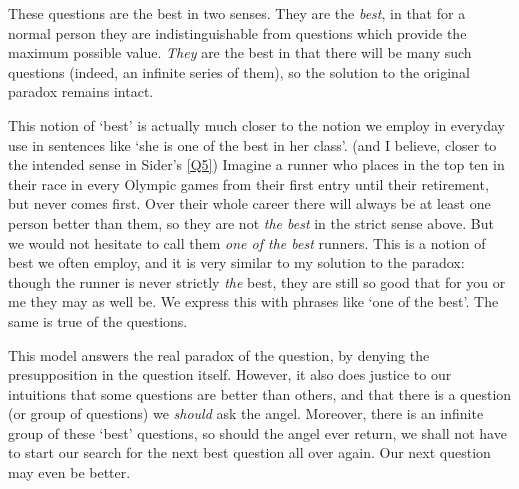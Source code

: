 These questions are the best in two senses.
They are the \emph{best}, in that for a normal person they are indistinguishable from questions which provide the maximum possible value.
\emph{They} are the best in that there will be many such questions (indeed, an infinite series of them), so the solution to the original paradox remains intact.

This notion of `best' is actually much closer to the notion we employ in everyday use in sentences like `she is one of the best in her class'. (and I believe, closer to the intended sense in Sider's \ref{Q5})
Imagine a runner who places in the top ten in their race in every Olympic games from their first entry until their retirement, but never comes first.
Over their whole career there will always be at least one person better than them, so they are not \emph{the best} in the strict sense above.
But we would not hesitate to call them \emph{one of the best} runners.
This is a notion of best we often employ, and it is very similar to my solution to the paradox: though the runner is never strictly \emph{the} best, they are still so good that for you or me they may as well be.
We express this with phrases like `one of the best'.
The same is true of the questions.

This model answers the real paradox of the question, by denying the presupposition in the question itself.
However, it also does justice to our intuitions that some questions are better than others, and that there is a question (or group of questions) we \emph{should} ask the angel.
Moreover, there is an infinite group of these `best' questions, so should the angel ever return, we shall not have to start our search for the next best question all over again.
Our next question may even be better.
